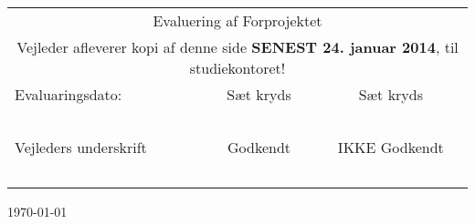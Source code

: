 \begin{center}
\begin{table}[H]
\end{table}

\ \\
\ \\
\ \\
\ \\
\ \\
\ \\
\begin{table}[H]
\begin{tabular}{|p{8.77cm}|c|c|}
	\hline
	\multicolumn{3}{|c|}{\huge Evaluering af Forprojektet}\\
	\multicolumn{3}{|c|}{Vejleder afleverer kopi af denne side \textbf{SENEST 24. januar 2014}, til studiekontoret!}\\ \hline
    Evaluaringsdato: & Sæt kryds & Sæt kryds\\
    ~&  ~ & ~\\ \cline{1-1} 
    Vejleders underskrift & Godkendt & IKKE Godkendt \\
    ~ & ~ & ~  \\\hline
    \end{tabular}
\end{table}

\vfill %

{\large \today}\\[3cm] %
\end{center}
